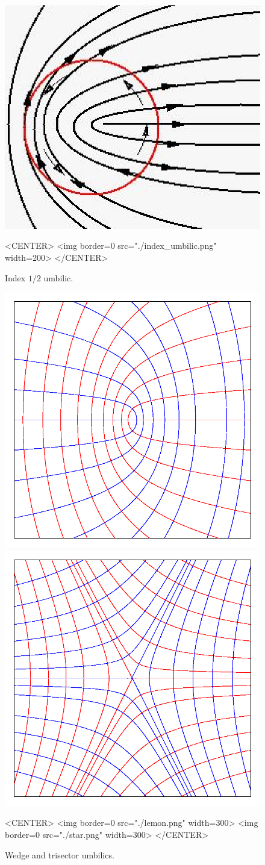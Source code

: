 \begin{figure}[!ht]
\begin{ccTexOnly}
\centerline{
\includegraphics[width=.5\linewidth]{Ridges_3/index_umbilic}}
\end{ccTexOnly}
\caption{Index $1/2$ umbilic.}
\label{index_umbilic}
\begin{ccHtmlOnly}
<CENTER> <img border=0 src="./index_umbilic.png" width=200>
</CENTER>
\end{ccHtmlOnly}
\end{figure}


\begin{figure}[!ht]
\begin{ccTexOnly}
\centerline{
\includegraphics[width=.5\linewidth]{Ridges_3/lemon}
\includegraphics[width=.5\linewidth]{Ridges_3/star}}
\end{ccTexOnly}
\caption{Wedge and trisector umbilics.}
\label{umbilics}
\begin{ccHtmlOnly}
<CENTER> <img border=0 src="./lemon.png" width=300>
 <img border=0 src="./star.png" width=300>
</CENTER>
\end{ccHtmlOnly}
\end{figure}



